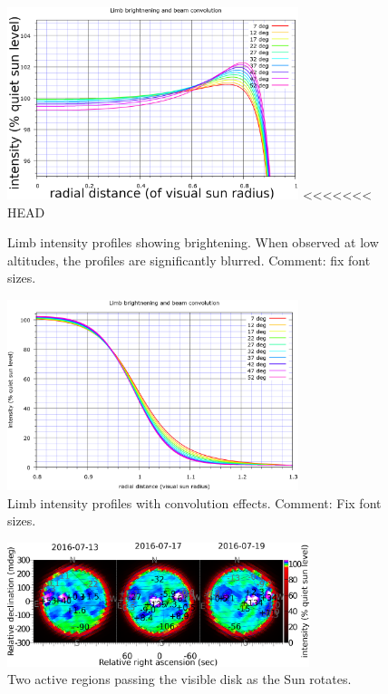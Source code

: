 \documentclass{aa}
\begin{document}
\begin{figure}
\centering
\includegraphics[width=8.5cm]{limbmodel_profiles1.png}
<<<<<<< HEAD
\caption{Limb intensity profiles showing brightening. When observed at low altitudes, the profiles are significantly blurred. Comment: fix font sizes.}
\label{limb_brightening1}
\end{figure}

\begin{figure}
\centering
\includegraphics[width=8.5cm]{limbmodel_profiles2.png}
\caption{Limb intensity profiles with convolution effects. Comment: Fix font sizes.}
\label{limb_brightening2}
\end{figure}

\begin{figure}
\centering
\includegraphics[width=8.8cm]{maptrack1.png}
\caption{Two active regions passing the visible disk as the Sun rotates.}
\label{maptrack1}
\end{figure}
\end{document}
